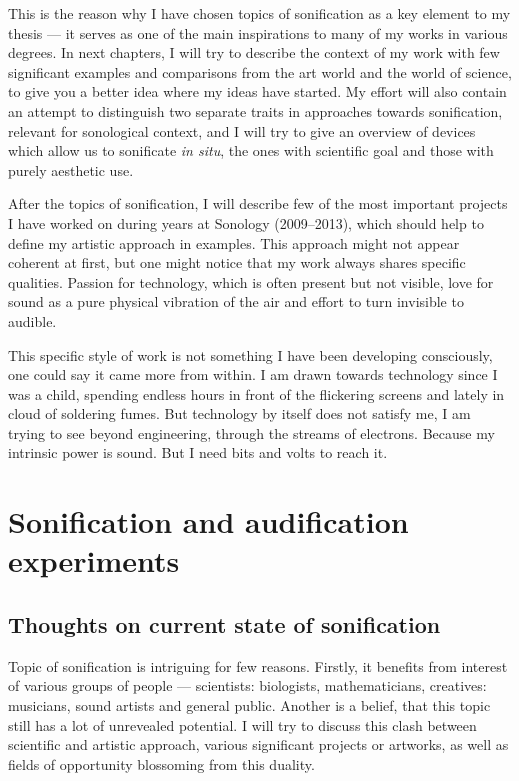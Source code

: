 \documentclass[12pt,a4paper,oneside]{report}
\begin{document}
This is the reason why I have chosen topics of sonification as a key element to my thesis --- it serves as one of the main inspirations to many of my works in various degrees. In next chapters, I will try to describe the context of my work with few significant examples and comparisons from the art world and the world of science, to give you a better idea where my ideas have started. My effort will also contain an attempt to distinguish two separate traits in approaches towards sonification, relevant for sonological context, and I will try to give an overview of devices which allow us to sonificate \textit{in situ}, the ones with scientific goal and those with purely aesthetic use.

After the topics of sonification, I will describe few of the most important projects I have worked on during years at Sonology (2009--2013), which should help to define my artistic approach in examples. This approach might not appear coherent at first, but one might notice that my work always shares specific qualities. Passion for technology, which is often present but not visible, love for sound as a pure physical vibration of the air and effort to turn invisible to audible.

This specific style of work is not something I have been developing consciously, one could say it came more from within. I am drawn towards technology since I was a child, spending endless hours in front of the flickering screens and lately in cloud of soldering fumes. But technology by itself does not satisfy me, I am trying to see beyond engineering, through the streams of electrons. Because my intrinsic power is sound. But I need bits and volts to reach it.


\chapter{Sonification and audification experiments}

\section{Thoughts on current state of sonification}

Topic of sonification is intriguing for few reasons. Firstly, it benefits from interest of various groups of people --- scientists: biologists, mathematicians, creatives: musicians, sound artists and general public. Another is a belief, that this topic still has a lot of unrevealed potential. I will try to discuss this clash between scientific and artistic approach, various significant projects or artworks, as well as fields of opportunity blossoming from this duality.
\end{document}
